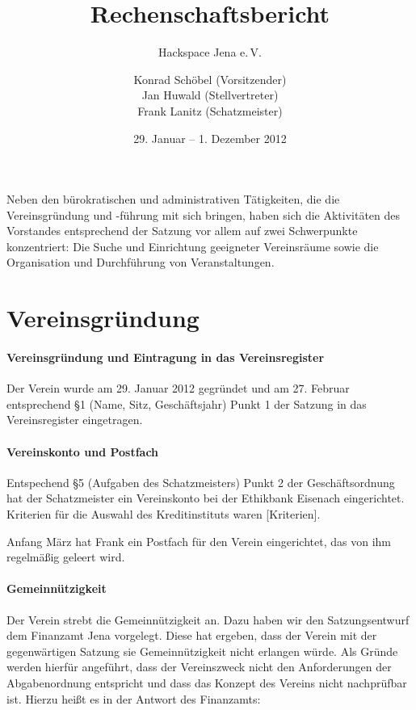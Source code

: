 \documentclass[10pt,DIV16]{scrartcl}
\title{Rechenschaftsbericht}
\subtitle{Hackspace Jena e.\,V.}
\author{%
	Konrad Schöbel (Vorsitzender)\\
	Jan Huwald (Stellvertreter)\\
	Frank Lanitz (Schatzmeister)
}
\date{29. Januar -- 1. Dezember 2012}
\begin{document}
\maketitle

\tableofcontents

Neben den bürokratischen und administrativen Tätigkeiten, die die
Vereinsgründung und -führung mit sich bringen, haben sich die Aktivitäten des
Vorstandes entsprechend der Satzung vor allem auf zwei Schwerpunkte
konzentriert:  Die Suche und Einrichtung geeigneter Vereinsräume sowie die
Organisation und Durchführung von Veranstaltungen.


\section{Vereinsgründung}

\paragraph{Vereinsgründung und Eintragung in das Vereinsregister}

Der Verein wurde am 29. Januar 2012 gegründet und am 27. Februar entsprechend
§1 (Name, Sitz, Geschäftsjahr) Punkt 1 der Satzung in das Vereinsregister
eingetragen.

\paragraph{Vereinskonto und Postfach}

Entspechend §5 (Aufgaben des Schatzmeisters) Punkt 2 der Geschäftsordnung hat
der Schatzmeister ein Vereinskonto bei der Ethikbank Eisenach eingerichtet.
Kriterien für die Auswahl des Kreditinstituts waren [Kriterien].

Anfang März hat Frank ein Postfach für den Verein eingerichtet, das von ihm
regelmäßig geleert wird. 


\paragraph{Gemeinnützigkeit}

Der Verein strebt die Gemeinnützigkeit an.  Dazu haben wir den Satzungsentwurf
dem Finanzamt Jena vorgelegt.  Diese hat ergeben, dass der Verein mit der
gegenwärtigen Satzung sie Gemeinnützigkeit nicht erlangen würde.  Als Gründe
werden hierfür angeführt, dass der Vereinszweck nicht den Anforderungen der
Abgabenordnung entspricht und dass das Konzept des Vereins nicht nachprüfbar
ist.  Hierzu heißt es in der Antwort des Finanzamts:
\end{document}
